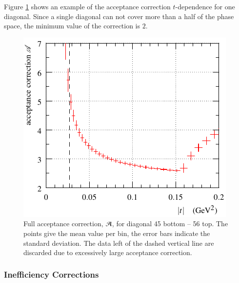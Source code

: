 Figure \ref{fig:acceptance result} shows an example of the acceptance correction $t$-dependence for one diagonal. Since a single diagonal can not cover more than a half of the phase space, the minimum value of the correction is $2$.

\begin{figure}
\begin{center}
\includegraphics{fig/acc_corr_hists.pdf}
\vskip-3mm
\caption{%
Full acceptance correction, ${\cal A}$, for diagonal 45 bottom -- 56 top. The points give the mean value per bin, the error bars indicate the standard deviation. The data left of the dashed vertical line are discarded due to excessively large acceptance correction.
}
\label{fig:acceptance result}
\end{center}
\end{figure}


\subsubsection{Inefficiency Corrections}
\label{sec:ineff corr}

